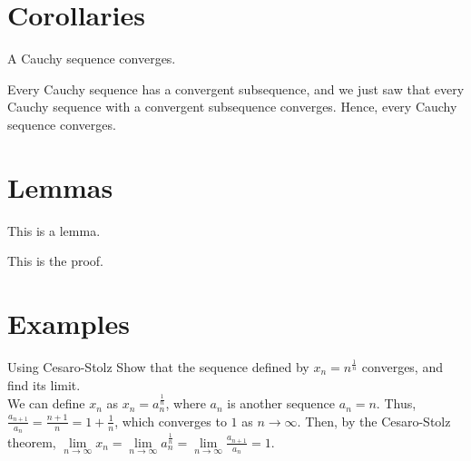 \documentclass[a4paper,12pt]{article}
\begin{document}
\section{Corollaries}
\begin{corollary}{}{}
    A Cauchy sequence converges.
\end{corollary}
\begin{cproof*}{}{}
    Every Cauchy sequence has a convergent subsequence, and we just saw that every Cauchy sequence with a convergent subsequence converges.
    Hence, every Cauchy sequence converges.
\end{cproof*}

\section{Lemmas}
\begin{lemma}{}{}
    This is a lemma.
\end{lemma}
\begin{lproof*}{}{}
    This is the proof. 
\end{lproof*}

\section{Examples}
\begin{example}{Using Cesaro-Stolz}{}
    Show that the sequence defined by $x_n = n^\frac{1}{n}$ converges, and find its limit. \\

    We can define $x_n$ as $x_n = a_n^{\frac{1}{n}}$, where $a_n$ is another sequence $a_n = n$.
    Thus, $\frac{a_{n+1}}{a_n} = \frac{n+1}{n} = 1 + \frac{1}{n}$, which converges to $1$ as $n\to\infty$.
    Then, by the Cesaro-Stolz theorem, $\lim\limits_{n\to\infty}x_n = \lim\limits_{n\to\infty}a_n^{\frac{1}{n}} = \lim\limits_{n\to\infty} \frac{a_{n+1}}{a_n} = 1$.
\end{example}
\end{document}
